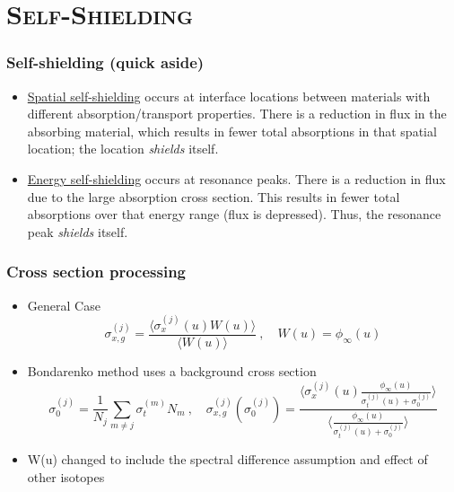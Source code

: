 \documentclass[xcolor=x11names,compress]{beamer}
\renewcommand{\(}{\begin{columns}}
\renewcommand{\)}{\end{columns}}
\newcommand{\<}[1]{\begin{column}{#1}}
\renewcommand{\>}{\end{column}}
\newcommand{\micro}{\ensuremath{\sigma}}
\begin{document}
\section{\scshape Self-Shielding}
\begin{frame}[fragile]
  \frametitle{Self-shielding (quick aside)}

	\begin{itemize}
	\item \underline{Spatial self-shielding} occurs at interface locations between materials with different absorption/transport properties. There is a reduction in flux in the absorbing material, which results in fewer total absorptions in that spatial location; the location \textit{shields} itself. \vspace*{1em}
	
	\item \underline{Energy self-shielding} occurs at resonance peaks. There is a reduction in flux due to the large absorption cross section. This results in fewer total absorptions over that energy range (flux is depressed). Thus, the resonance peak \textit{shields} itself.
	\end{itemize}

\end{frame}


\begin{frame}[fragile]
  \frametitle{Cross section processing \cite{Bondarenko1964}}

	\begin{itemize}
	\item General Case
	\begin{equation}
  	\micro_{x,g}^{(j)} = \frac{\langle \micro_x^{(j)}(u) W(u)\rangle}
	{\langle W(u)\rangle} \:, \quad W(u) = \phi_{\infty}(u) \nonumber
 	 \label{eq:baseBondarenko}
 	\end{equation} 
 	
 	\pause
 	\item Bondarenko method uses a background cross section
 	\begin{equation}
  	\micro_0^{(j)} = \frac{1}{N_j} \sum_{m \ne j} \micro_{t}^{(m)} N_m 
  	\:, \quad \micro_{x,g}^{(j)}(\micro_0^{(j)}) = \frac{\langle
  	 \micro_{x}^{(j)}(u) \frac{\phi_{\infty}(u)} {\micro_{t}^{(j)}(u)
  	 + \micro_0^{(j)}} \rangle}
  	 { \langle \frac{\phi_{\infty}(u)}{\micro_{t}^{(j)}(u) +
  	 \micro_0^{(j)}}\rangle} \nonumber
  \label{eq:ssfact}
	\end{equation}
	\item W(u) changed to include the  spectral difference assumption and effect of other isotopes
	\end{itemize}
	
\end{frame}
	
\end{document}
